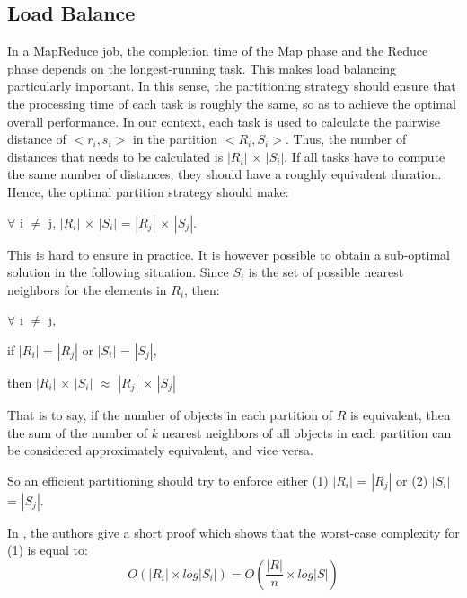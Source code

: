 \subsection{Load Balance}
In a MapReduce job, the completion time of the Map phase and the Reduce phase depends on the longest-running task. This makes load balancing particularly 
important. In this sense, the partitioning strategy should ensure that the processing time of each task is roughly the same, so as to achieve the optimal 
overall 
performance. In our context, each task is used to calculate the pairwise distance of $<r_i, s_i>$ in the partition $<R_i, S_i>$. Thus, the number of distances that needs to be 
calculated is $\left| R_i \right|$ $\times$ $\left| S_i \right|$. If all tasks have to compute 
the same number of distances, they should have a roughly equivalent duration.  Hence, the optimal partition strategy should make:
\begin{center}
 $\forall$ i $\neq$ j, $\left| R_i \right|$ $\times$ $\left| S_i \right|$ = $\left| R_j \right|$ $\times$ $\left| S_j \right|$.
\end{center}

This is hard to ensure in practice. It is however possible
to obtain a sub-optimal solution in the following situation. Since 
$S_i$ is the set of possible nearest neighbors for the 
elements in $R_i$, then:
\begin{center}
$\forall$ i $\neq$ j, 

if $\left| R_i \right|$ = $\left| R_j \right|$ or $\left| S_i \right|$ = $\left| S_j \right|$, 

then $\left| R_i \right|$ $\times$ $\left| S_i \right|$ $\approx$ $\left| R_j \right|$ $\times$ $\left| S_j \right|$
\end{center} 
That is to say, if the number of objects in each partition of $R$ is equivalent, then the sum of the number of $k$ nearest neighbors of all objects in each partition can be considered approximately equivalent, and vice versa.

So an efficient partitioning should try to enforce either (1) $\left| R_i \right|$ = $\left| R_j \right|$ or (2) $\left| S_i \right|$ = $\left| S_j 
\right|$.

In \cite{Zhang:2012:EPK:2247596.2247602}, the authors give a short proof which 
shows that the worst-case complexity for (1) is equal to:
\begin{equation}
O\left(\left|R_i\right| \times log\left|S_i\right|\right) = O\left(\frac{\left|R\right|}{n} \times log\left|S\right|\right) \label{eq:complexity1}
\end{equation}


